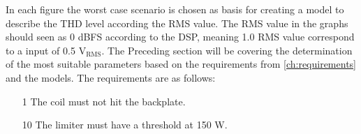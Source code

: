 In each figure the worst case scenario is chosen as basis for creating a model to describe the THD level according the RMS value. The RMS value in the graphs should seen as 0 dBFS according to the DSP, meaning 1.0 RMS value correspond to a input of 0.5 $\text{V}_\text{RMS}$. The Preceding section will be covering the determination of the most suitable parameters based on the requirements from \autoref{ch:requirements} and the models. The requirements are as follows:

\begin{enumerate}
\item[1] The coil must not hit the backplate.
\item[10] The limiter must have a threshold at 150 W.
\end{enumerate}











%